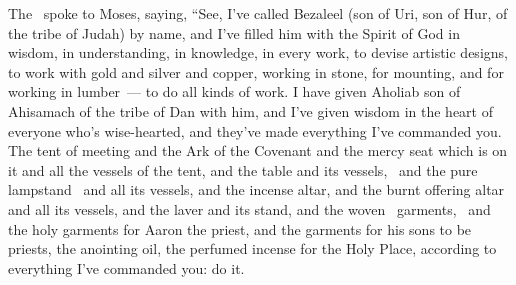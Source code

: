 
\begin{inparaenum}
   The \lord\ spoke to Moses, saying,%
   ``See, I've called Bezaleel (son of Uri, son of Hur, of the tribe of Judah) by name,%
   and I've filled him with the Spirit of God in wisdom, in understanding, in knowledge, in every work,%
   to devise artistic designs, to work with gold and silver and copper,%
   working in stone, for mounting, and for working in lumber~--- to do all kinds of work.%
   I have given Aholiab son of Ahisamach of the tribe of Dan with him, and I've given wisdom in the heart of everyone who's wise-hearted, and they've made everything I've commanded you.%
   The tent of meeting and the Ark of the Covenant and the mercy seat which is on it and all the vessels of the tent,%
   and the table and its vessels,\
  and the pure lampstand\
  \halot{xxxx}{not candlestick}
  and all its vessels, and the incense altar,%
  \vrs{31:9} and the burnt offering altar and all its vessels, and the laver and its stand,%
  \vrs{31:10} and the woven\
  garments,\
  and the holy garments for Aaron the priest, and the garments for his sons to be priests,%
  \vrs{31:11} the anointing oil, the perfumed incense for the Holy Place, according to everything I've commanded you: do it.%


\end{inparaenum}
